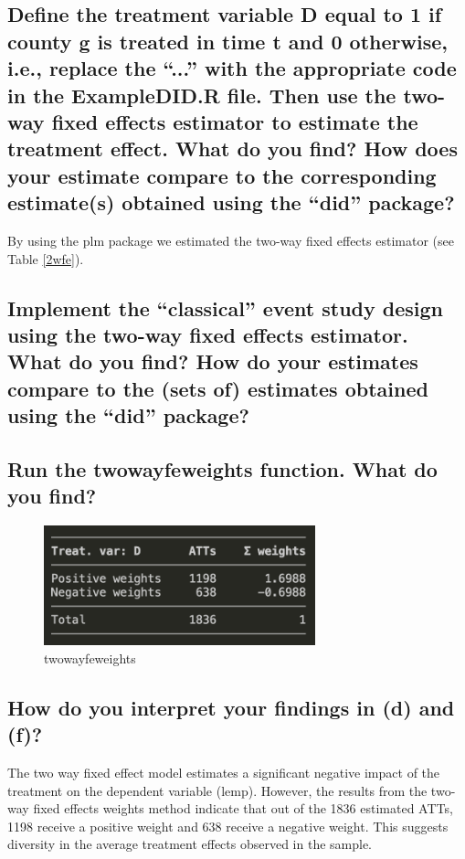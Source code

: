 \documentclass[12pt]{article}
\begin{document}
\subsection{Define the treatment variable D equal to 1 if county g is treated in time t and 0 otherwise, i.e., replace the “...” with the appropriate code in the ExampleDID.R file. Then use the two-way fixed effects estimator to estimate the treatment effect. What do you find? How does your estimate compare to the corresponding estimate(s) obtained using the “did” package?}

By using the plm package we estimated the two-way fixed effects estimator (see Table \ref{2wfe}). 
\subsection{Implement the “classical” event study design using the two-way fixed effects estimator. What do you find? How do your estimates compare to the (sets of) estimates obtained using the “did” package?}
\subsection{Run the twowayfeweights function. What do you find?}
\begin{figure}[htbp]
    \centering
    \includegraphics[width=0.7\textwidth]{media/2wfeg.png}
        \caption{twowayfeweights}
        \label{2wfew}
\end{figure}
\subsection{How do you interpret your findings in (d) and (f)?}
The two way fixed effect model estimates a significant negative impact of the treatment on the dependent variable (lemp). However, the results from the two-way fixed effects weights method indicate that out of the 1836 estimated ATTs, 1198 receive a positive weight and 638 receive a negative weight. This suggests diversity in the average treatment effects observed in the sample. 
\end{document}
